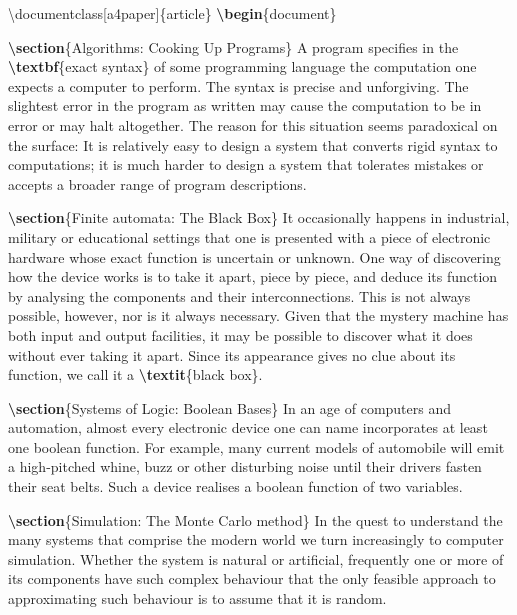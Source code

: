 \documentclass[
]{book}
\newenvironment{Shaded}{\begin{snugshade}}{\end{snugshade}}
\newcommand{\BuiltInTok}[1]{#1}
\newcommand{\ExtensionTok}[1]{#1}
\newcommand{\FunctionTok}[1]{\textcolor[rgb]{0.13,0.29,0.53}{\textbf{#1}}}
\newcommand{\KeywordTok}[1]{\textcolor[rgb]{0.13,0.29,0.53}{\textbf{#1}}}
\newcommand{\NormalTok}[1]{#1}
\begin{document}
\begin{Shaded}
\begin{Highlighting}[]
\BuiltInTok{\textbackslash{}documentclass}\NormalTok{[a4paper]\{}\ExtensionTok{article}\NormalTok{\}}
\KeywordTok{\textbackslash{}begin}\NormalTok{\{}\ExtensionTok{document}\NormalTok{\}}


\KeywordTok{\textbackslash{}section}\NormalTok{\{Algorithms: Cooking Up Programs\}}
\NormalTok{A program specifies in the }\FunctionTok{\textbackslash{}textbf}\NormalTok{\{exact syntax\} of some programming language the computation one expects a computer to perform. The syntax is precise and unforgiving. The slightest error in the program as written may cause the computation to be in error or may halt altogether. The reason for this situation seems paradoxical on the surface: It is relatively easy to design a system that converts rigid syntax to computations; it is much harder to design a system that tolerates mistakes or accepts a broader range of program descriptions.}

\KeywordTok{\textbackslash{}section}\NormalTok{\{Finite automata: The Black Box\}}
\NormalTok{It occasionally happens in industrial, military or educational settings that one is presented with a piece of electronic hardware whose exact function is uncertain or unknown. One way of discovering how the device works is to take it apart, piece by piece, and deduce its function by analysing the components and their interconnections. This is not always possible, however, nor is it always necessary. Given that the mystery machine has both input and output facilities, it may be possible to discover what it does without ever taking it apart. Since its appearance gives no clue about its function, we call it a }\FunctionTok{\textbackslash{}textit}\NormalTok{\{black box\}.}

\KeywordTok{\textbackslash{}section}\NormalTok{\{Systems of Logic: Boolean Bases\}}
\NormalTok{In an age of computers and automation, almost every electronic device one can name incorporates at least one boolean function. For example, many current models of automobile will emit a high{-}pitched whine, buzz or other disturbing noise until their drivers fasten their seat belts. Such a device realises a boolean function of two variables.}

\KeywordTok{\textbackslash{}section}\NormalTok{\{Simulation: The Monte Carlo method\}}
\NormalTok{In the quest to understand the many systems that comprise the modern world we turn increasingly to computer simulation. Whether the system is natural or artificial, frequently one or more of its components have such complex behaviour that the only feasible approach to approximating such behaviour is to assume that it is random.}


\end{Highlighting}
\end{Shaded}
\end{document}
